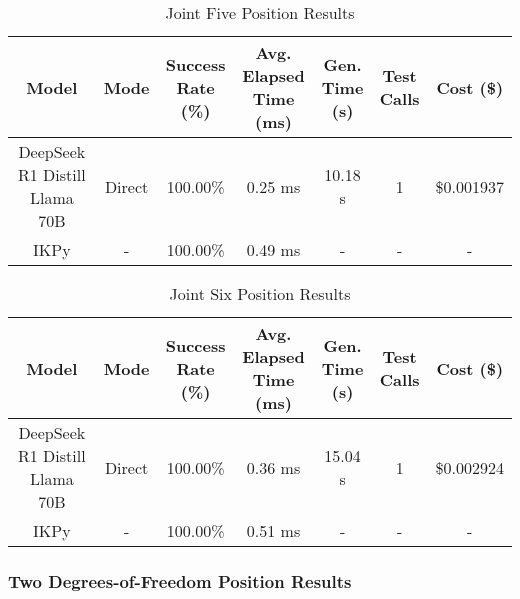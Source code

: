 \begin{landscape}
\begin{table}[H]
\tiny
\renewcommand{\arraystretch}{1.2}
\caption{Joint Five Position Results}
\begin{center}
\begin{tabular}{|c|c|c|c|c|c|c|}
    \hline
    \textbf{Model} & 
    \textbf{Mode} & 
    \makecell{\textbf{Success}\\\textbf{Rate (\%)}} &
    \makecell{\textbf{Avg. Elapsed}\\\textbf{Time (ms)}} &
    \makecell{\textbf{Gen.}\\\textbf{Time (s)}} &
    \makecell{\textbf{Test}\\\textbf{Calls}} &
    \textbf{Cost (\$)} \\
    \hline
    DeepSeek R1 Distill Llama 70B & Direct & 100.00\% & 0.25 ms & 10.18 s & 1 & \$0.001937 \\
    \hline
    IKPy & - & 100.00\% & 0.49 ms & - & - & - \\
    \hline
\end{tabular}
\label{Results-Position-5-5}
\end{center}
\end{table}

\begin{table}[H]
\tiny
\renewcommand{\arraystretch}{1.2}
\caption{Joint Six Position Results}
\begin{center}
\begin{tabular}{|c|c|c|c|c|c|c|}
    \hline
    \textbf{Model} & 
    \textbf{Mode} & 
    \makecell{\textbf{Success}\\\textbf{Rate (\%)}} &
    \makecell{\textbf{Avg. Elapsed}\\\textbf{Time (ms)}} &
    \makecell{\textbf{Gen.}\\\textbf{Time (s)}} &
    \makecell{\textbf{Test}\\\textbf{Calls}} &
    \textbf{Cost (\$)} \\
    \hline
    DeepSeek R1 Distill Llama 70B & Direct & 100.00\% & 0.36 ms & 15.04 s & 1 & \$0.002924 \\
    \hline
    IKPy & - & 100.00\% & 0.51 ms & - & - & - \\
    \hline
\end{tabular}
\label{Results-Position-6-6}
\end{center}
\end{table}

\subsubsection{Two Degrees-of-Freedom Position Results}


\end{landscape}
